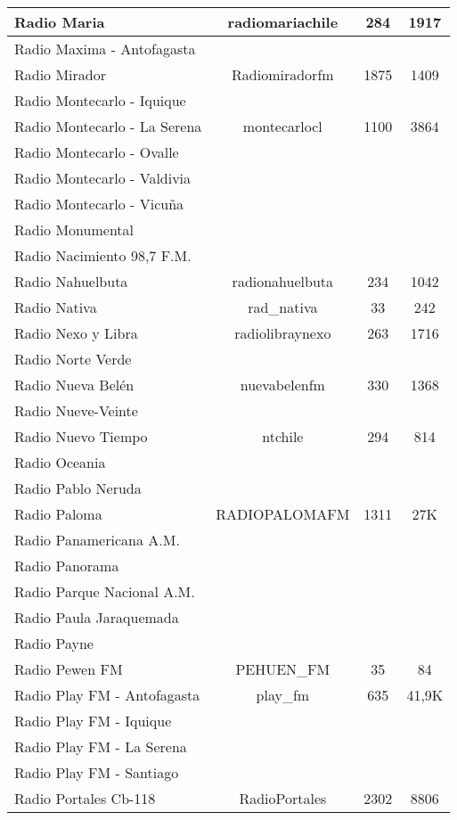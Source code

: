 \begin{center}
\begin{longtable}{| l | c | c | c |}
Radio Maria	&	radiomariachile	&	284	&	1917	\\ \hline
Radio Maxima - Antofagasta	&		&		&		\\ \hline
Radio Mirador	&	Radiomiradorfm	&	1875	&	1409	\\ \hline
Radio Montecarlo - Iquique	&		&		&		\\ \hline
Radio Montecarlo - La Serena	&	montecarlocl	&	1100	&	3864	\\ \hline
Radio Montecarlo - Ovalle	&		&		&		\\ \hline
Radio Montecarlo - Valdivia	&		&		&		\\ \hline
Radio Montecarlo - Vicuña	&		&		&		\\ \hline
Radio Monumental	&		&		&		\\ \hline
Radio Nacimiento 98,7 F.M.	&		&		&		\\ \hline
Radio Nahuelbuta	&	radionahuelbuta	&	234	&	1042	\\ \hline
Radio Nativa	&	rad\_nativa	&	33	&	242	\\ \hline
Radio Nexo y Libra	&	radiolibraynexo	&	263	&	1716	\\ \hline
Radio Norte Verde	&		&		&		\\ \hline
Radio Nueva Belén	&	nuevabelenfm	&	330	&	1368	\\ \hline
Radio Nueve-Veinte	&		&		&		\\ \hline
Radio Nuevo Tiempo	&	ntchile	&	294	&	814	\\ \hline
Radio Oceania	&		&		&		\\ \hline
Radio Pablo Neruda	&		&		&		\\ \hline
Radio Paloma	&	RADIOPALOMAFM	&	1311	&	27K	\\ \hline
Radio Panamericana A.M.	&		&		&		\\ \hline
Radio Panorama	&		&		&		\\ \hline
Radio Parque Nacional A.M.	&		&		&		\\ \hline
Radio Paula Jaraquemada	&		&		&		\\ \hline
Radio Payne	&		&		&		\\ \hline
Radio Pewen FM	&	PEHUEN\_FM	&	35	&	84	\\ \hline
Radio Play FM - Antofagasta	&	play\_fm	&	635	&	41,9K	\\ \hline
Radio Play FM - Iquique	&		&		&		\\ \hline
Radio Play FM - La Serena	&		&		&		\\ \hline
Radio Play FM - Santiago	&		&		&		\\ \hline
Radio Portales Cb-118	&	RadioPortales	&	2302	&	8806	\\ \hline

\end{longtable}
\end{center}
